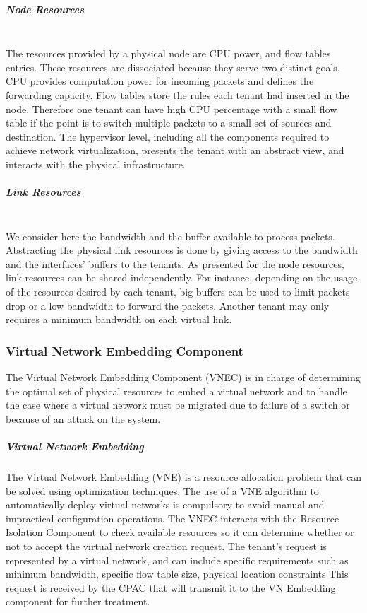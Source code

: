 \subparagraph{\textbf{Node Resources}}\textbf{}\\
The resources provided by a physical node are CPU power, and flow tables entries.
These resources are dissociated because they serve two distinct goals.
CPU provides computation power for incoming packets and defines the forwarding capacity.
Flow tables store the rules each tenant had inserted in the node.
Therefore one tenant can have high CPU percentage with a small flow table if the point is to switch multiple packets to a small set of sources and destination.
The hypervisor level, including all the components required to achieve network virtualization, presents the tenant with an abstract view, and interacts with the physical infrastructure.

\subparagraph{\textbf{Link Resources}}\textbf{}\\
We consider here the bandwidth and the buffer available to process packets.
Abstracting the physical link resources is done by giving access to the bandwidth and the interfaces' buffers to the tenants.
As presented for the node resources, link resources can be shared independently.
For instance, depending on the usage of the resources desired by each tenant, big buffers can be used to limit packets drop or a low bandwidth to forward the packets.
Another tenant may only requires a minimum bandwidth on each virtual link.

\subsubsection{Virtual Network Embedding Component}

The Virtual Network Embedding Component (VNEC) is in charge of determining the optimal set of physical resources to embed a virtual network and to handle the case where a virtual network must be migrated due to failure of a switch or because of an attack on the system.

\subparagraph{Virtual Network Embedding}
The Virtual Network Embedding (VNE) is a resource allocation problem that can be solved using optimization techniques.
The use of a VNE algorithm to automatically deploy virtual networks is compulsory to avoid manual and impractical configuration operations.
The VNEC interacts with the Resource Isolation Component to check available resources so it can determine whether or not to accept the virtual network creation request.
The tenant's request is represented by a virtual network, and can include specific requirements such as minimum bandwidth, specific flow table  size, physical location constraints \etc 
This request is received by the CPAC that will transmit it to the VN Embedding component for further treatment.

